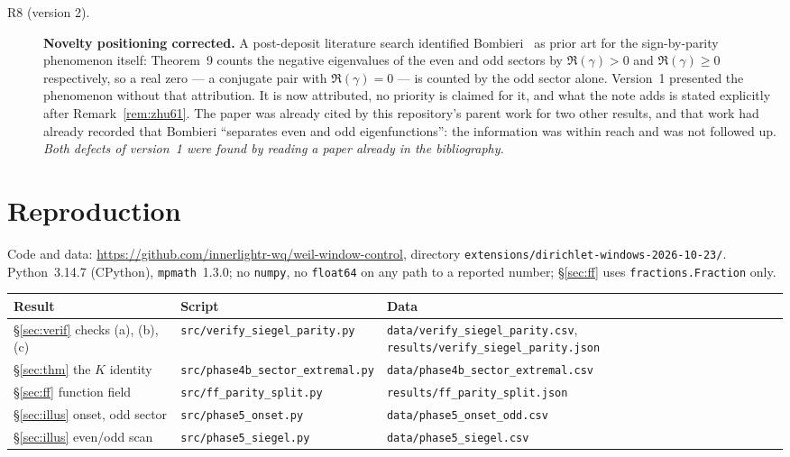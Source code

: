 \documentclass[11pt,a4paper]{article}
\theoremstyle{remark}
\newcommand{\src}[1]{{\footnotesize\texttt{#1}}}
\begin{document}
\begin{description}
\item[R8 (version 2).] \textbf{Novelty positioning corrected.} A post-deposit literature
search identified Bombieri~\cite[\S9]{Bombieri} as prior art for the sign-by-parity
phenomenon itself: Theorem~9 counts the negative eigenvalues of the even and odd sectors by
$\Re(\gamma)>0$ and $\Re(\gamma)\ge0$ respectively, so a real zero --- a conjugate pair with
$\Re(\gamma)=0$ --- is counted by the odd sector alone. Version~1 presented the phenomenon
without that attribution. It is now attributed, no priority is claimed for it, and what the
note adds is stated explicitly after Remark~\ref{rem:zhu61}. The paper was already cited by
this repository's parent work for two other results, and that work had already recorded that
Bombieri ``separates even and odd eigenfunctions'': the information was within reach and was
not followed up. \emph{Both defects of version~1 were found by reading a paper already in
the bibliography.}
\end{description}

\section{Reproduction}\label{app:repro}

Code and data: \url{https://github.com/innerlightr-wq/weil-window-control}, directory
\src{extensions/dirichlet-windows-2026-10-23/}. Python~3.14.7 (CPython),
\texttt{mpmath}~1.3.0; no \texttt{numpy}, no \texttt{float64} on any path to a reported
number; \S\ref{sec:ff} uses \texttt{fractions.Fraction} only.

\begin{center}\small
\begin{tabular}{@{}lll@{}}
\toprule
Result & Script & Data \\
\midrule
\S\ref{sec:verif} checks (a), (b), (c) & \src{src/verify\_siegel\_parity.py} & \src{data/verify\_siegel\_parity.csv}, \src{results/verify\_siegel\_parity.json} \\
\S\ref{sec:thm} the $K$ identity & \src{src/phase4b\_sector\_extremal.py} & \src{data/phase4b\_sector\_extremal.csv} \\
\S\ref{sec:ff} function field & \src{src/ff\_parity\_split.py} & \src{results/ff\_parity\_split.json} \\
\S\ref{sec:illus} onset, odd sector & \src{src/phase5\_onset.py} & \src{data/phase5\_onset\_odd.csv} \\
\S\ref{sec:illus} even/odd scan & \src{src/phase5\_siegel.py} & \src{data/phase5\_siegel.csv} \\
\bottomrule
\end{tabular}
\end{center}
\end{document}
